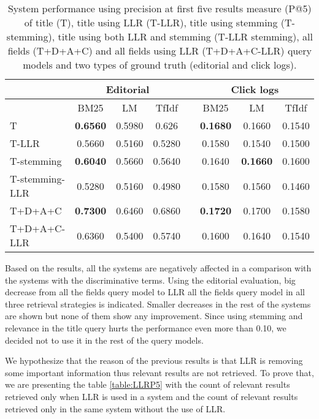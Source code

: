 \begin{table}[H]
\begin{center}
\caption{System performance   using precision at first five results measure (P@5) of title (T), title using LLR (T-LLR), title using stemming (T-stemming), title using both LLR and stemming (T-LLR stemming), all fields (T+D+A+C) and all fields using LLR (T+D+A+C-LLR) query models and two types of ground truth (editorial and click logs).}
\label{table:discP5}

\begin{tabular}{lccccccc}
\toprule
 & \multicolumn{3}{c}{Editorial} & & \multicolumn{3}{c}{Click logs} \\
\midrule
 & BM25 & LM & TfIdf &   & BM25 & LM & TfIdf \\
\midrule
T & \textbf{0.6560} &  0.5980 & 0.626 &   &      \textbf{0.1680} & 0.1660 & 0.1540 \\
T-LLR & 0.5660 & 0.5160 & 0.5280 &   &	 		 0.1580 & 0.1540 & 0.1500 \\
\midrule
T-stemming 	& \textbf{0.6040} & 0.5660 & 0.5640 &   &	 0.1640 & \textbf{0.1660} & 0.1600 \\
T-stemming-LLR & 0.5280 & 0.5160 & 0.4980 &   &	 0.1580 & 0.1560 & 0.1460 \\
\midrule
T+D+A+C & \textbf{0.7300} & 0.6460 & 0.6860 &   &		 \textbf{0.1720} & 0.1700 & 0.1580 \\
T+D+A+C-LLR & 0.6360 & 0.5400 & 0.5740 &   &	 0.1600 & 0.1640 & 0.1540 \\
\bottomrule
\end{tabular}
\end{center}
\end{table}


Based on the results, all the systems are negatively affected in a comparison with the systems with the discriminative terms. Using the editorial evaluation, big decrease from all the fields query model to LLR all the fields query model in all three retrieval strategies is indicated. Smaller decreases in the rest of the systems are shown but none of them show any improvement. Since using stemming and relevance in the title query hurts the performance even more than 0.10, we decided not to use it in the rest of the query models.


We hypothesize that the reason of the previous results is that LLR is removing some important information thus relevant results are not retrieved. To prove that, we are presenting the table \ref{table:LLRP5} with the count of relevant results retrieved only when LLR is used in a system and the count of relevant results retrieved only in the same system without the use of LLR.

